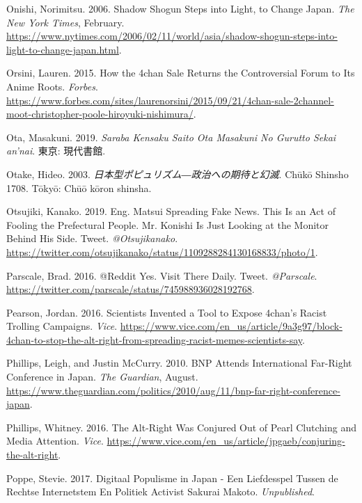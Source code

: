 \documentclass[10pt,british,A4paper,,openany]{memoir}
\begin{document}
\hypertarget{ref-onishi_shadow_2006}{}
Onishi, Norimitsu. 2006. Shadow Shogun Steps into Light, to Change
Japan. \emph{The New York Times}, February.
\url{https://www.nytimes.com/2006/02/11/world/asia/shadow-shogun-steps-into-light-to-change-japan.html}.

\hypertarget{ref-orsini_how_2015}{}
Orsini, Lauren. 2015. How the 4chan Sale Returns the Controversial Forum
to Its Anime Roots. \emph{Forbes}.
\url{https://www.forbes.com/sites/laurenorsini/2015/09/21/4chan-sale-2channel-moot-christopher-poole-hiroyuki-nishimura/}.

\hypertarget{ref-ota_saraba_2019}{}
Ota, Masakuni. 2019. \emph{Saraba Kensaku Saito Ota Masakuni No Gurutto
Sekai an'nai}. 東京: 現代書館.

\hypertarget{ref-otake__2003}{}
Otake, Hideo. 2003. \emph{日本型ポピュリズム―政治への期待と幻滅}. Chūkō
Shinsho 1708. Tōkyō: Chūō kōron shinsha.

\hypertarget{ref-otsujiki_eng._2019}{}
Otsujiki, Kanako. 2019. Eng. Matsui Spreading Fake News. This Is an Act
of Fooling the Prefectural People. Mr. Konishi Is Just Looking at the
Monitor Behind His Side. Tweet. \emph{@Otsujikanako}.
\url{https://twitter.com/otsujikanako/status/1109288284130168833/photo/1}.

\hypertarget{ref-parscale_reddit_2016}{}
Parscale, Brad. 2016. @Reddit Yes. Visit There Daily. Tweet.
\emph{@Parscale}.
\url{https://twitter.com/parscale/status/745988936028192768}.

\hypertarget{ref-pearson_scientists_2016}{}
Pearson, Jordan. 2016. Scientists Invented a Tool to Expose 4chan's
Racist Trolling Campaigns. \emph{Vice}.
\url{https://www.vice.com/en_us/article/9a3g97/block-4chan-to-stop-the-alt-right-from-spreading-racist-memes-scientists-say}.

\hypertarget{ref-phillips_bnp_2010}{}
Phillips, Leigh, and Justin McCurry. 2010. BNP Attends International
Far-Right Conference in Japan. \emph{The Guardian}, August.
\url{https://www.theguardian.com/politics/2010/aug/11/bnp-far-right-conference-japan}.

\hypertarget{ref-phillips_alt-right_2016}{}
Phillips, Whitney. 2016. The Alt-Right Was Conjured Out of Pearl
Clutching and Media Attention. \emph{Vice}.
\url{https://www.vice.com/en_us/article/jpgaeb/conjuring-the-alt-right}.

\hypertarget{ref-poppe_digitaal_2017}{}
Poppe, Stevie. 2017. Digitaal Populisme in Japan - Een Liefdesspel
Tussen de Rechtse Internetstem En Politiek Activist Sakurai Makoto.
\emph{Unpublished}.
\end{document}
